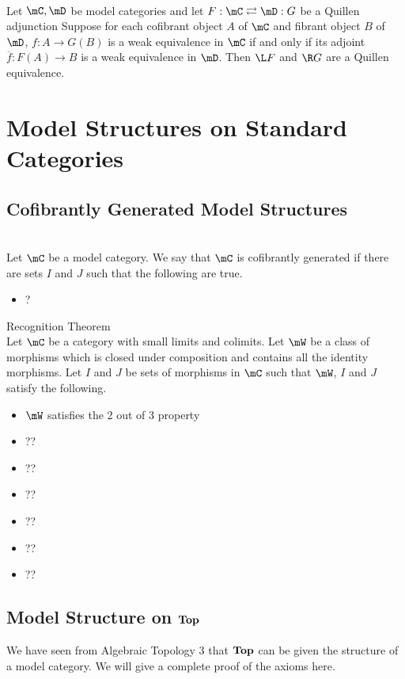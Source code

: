 \documentclass[a4paper]{article}
\begin{document}
\begin{thm}{}{}\\ Let $\mC,\mD$ be model categories and let $F:\mC\rightleftarrows\mD:G$ be a Quillen adjunction Suppose for each cofibrant object $A$ of $\mC$ and fibrant object $B$ of $\mD$, $f:A\to G(B)$ is a weak equivalence in $\mC$ if and only if its adjoint $\overline{f}:F(A)\to B$ is a weak equivalence in $\mD$. Then $\L F$ and $\R G$ are a Quillen equivalence. 
\end{thm}

\pagebreak
\section{Model Structures on Standard Categories}
\subsection{Cofibrantly Generated Model Structures}
\begin{defn}{}{}\\ Let $\mC$ be a model category. We say that $\mC$ is cofibrantly generated if there are sets $I$ and $J$ such that the following are true. 
\begin{itemize}
\item ?
\end{itemize}
\end{defn}

\begin{thm}{Recognition Theorem}{}\\ Let $\mC$ be a category with small limits and colimits. Let $\mW$ be a class of morphisms which is closed under composition and contains all the identity morphisms. Let $I$ and $J$ be sets of morphisms in $\mC$ such that $\mW$, $I$ and $J$ satisfy the following. 
\begin{itemize}
\item $\mW$ satisfies the 2 out of 3 property
\item ??
\item ??
\item ??
\item ??
\item ??
\item ??
\end{itemize}
\end{thm}

\subsection{Model Structure on $\bold{Top}$}
We have seen from Algebraic Topology 3 that $\bold{Top}$ can be given the structure of a model category. We will give a complete proof of the axioms here. 
\end{document}

